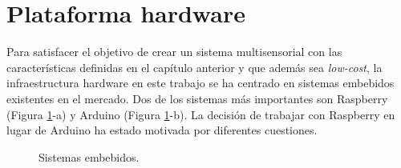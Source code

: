 \section{Plataforma hardware}
\label{sec:hw}
Para satisfacer el objetivo de crear un sistema multisensorial con las características definidas en el capítulo anterior y que además sea \textit{low-cost}, la infraestructura hardware en este trabajo se ha centrado en sistemas embebidos existentes en el mercado. Dos de los sistemas más importantes son Raspberry (Figura \ref{fig:placas}-a) y Arduino (Figura \ref{fig:placas}-b). La decisión de trabajar con Raspberry en lugar de Arduino ha estado motivada por diferentes cuestiones.\\
\begin{figure}[h!]
  \begin{center}
    \hspace{2mm}
  \end{center}
\caption{Sistemas embebidos.} \label{fig:placas}
\end{figure}

